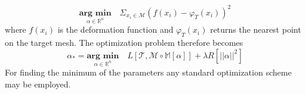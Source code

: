 \begin{equation}
    \underset{\alpha \in \mathbb{R}^n}{\textbf{arg min}}\quad \Sigma_{x_{i} \in \mathcal{M}} (f(x_{i}) - \varphi_{T}(x_{i}))^2
\end{equation}
where $f(x_{i})$ is the deformation function and $\varphi_{T}(x_{i})$ returns the nearest point on the target mesh. The optimization problem therefore becomes
\begin{equation}
    \alpha_{*} = \underset{\alpha \in \mathbb{R}^n}{\textbf{arg min}}\quad L[\mathcal{T}, \mathcal{M }\circ \mathbb{M}[\alpha]]+\lambda R[\left|\left|\alpha\right|\right|^{2}]
\end{equation}
For finding the minimum of the parameters any standard optimization scheme may be employed.
